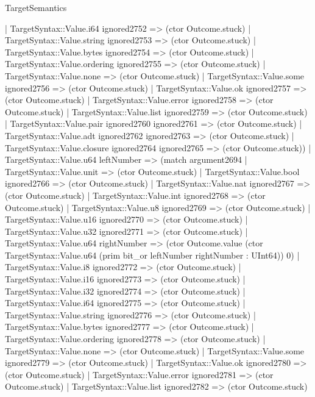 \begin{lexlean}{TargetSemantics}
\begin{semanticmodule}
{              | TargetSyntax::Value.i64 ignored2752 => (ctor Outcome.stuck)
              | TargetSyntax::Value.string ignored2753 => (ctor Outcome.stuck)
              | TargetSyntax::Value.bytes ignored2754 => (ctor Outcome.stuck)
              | TargetSyntax::Value.ordering ignored2755 => (ctor Outcome.stuck)
              | TargetSyntax::Value.none => (ctor Outcome.stuck)
              | TargetSyntax::Value.some ignored2756 => (ctor Outcome.stuck)
              | TargetSyntax::Value.ok ignored2757 => (ctor Outcome.stuck)
              | TargetSyntax::Value.error ignored2758 => (ctor Outcome.stuck)
              | TargetSyntax::Value.list ignored2759 => (ctor Outcome.stuck)
              | TargetSyntax::Value.pair ignored2760 ignored2761 => (ctor Outcome.stuck)
              | TargetSyntax::Value.adt ignored2762 ignored2763 => (ctor Outcome.stuck)
              | TargetSyntax::Value.closure ignored2764 ignored2765 => (ctor Outcome.stuck))
            | TargetSyntax::Value.u64 leftNumber => (match argument2694
              | TargetSyntax::Value.unit => (ctor Outcome.stuck)
              | TargetSyntax::Value.bool ignored2766 => (ctor Outcome.stuck)
              | TargetSyntax::Value.nat ignored2767 => (ctor Outcome.stuck)
              | TargetSyntax::Value.int ignored2768 => (ctor Outcome.stuck)
              | TargetSyntax::Value.u8 ignored2769 => (ctor Outcome.stuck)
              | TargetSyntax::Value.u16 ignored2770 => (ctor Outcome.stuck)
              | TargetSyntax::Value.u32 ignored2771 => (ctor Outcome.stuck)
              | TargetSyntax::Value.u64 rightNumber => (ctor Outcome.value (ctor TargetSyntax::Value.u64 (prim bit_or leftNumber rightNumber : UInt64)) 0)
              | TargetSyntax::Value.i8 ignored2772 => (ctor Outcome.stuck)
              | TargetSyntax::Value.i16 ignored2773 => (ctor Outcome.stuck)
              | TargetSyntax::Value.i32 ignored2774 => (ctor Outcome.stuck)
              | TargetSyntax::Value.i64 ignored2775 => (ctor Outcome.stuck)
              | TargetSyntax::Value.string ignored2776 => (ctor Outcome.stuck)
              | TargetSyntax::Value.bytes ignored2777 => (ctor Outcome.stuck)
              | TargetSyntax::Value.ordering ignored2778 => (ctor Outcome.stuck)
              | TargetSyntax::Value.none => (ctor Outcome.stuck)
              | TargetSyntax::Value.some ignored2779 => (ctor Outcome.stuck)
              | TargetSyntax::Value.ok ignored2780 => (ctor Outcome.stuck)
              | TargetSyntax::Value.error ignored2781 => (ctor Outcome.stuck)
              | TargetSyntax::Value.list ignored2782 => (ctor Outcome.stuck)
}
\end{semanticmodule}
\end{lexlean}
